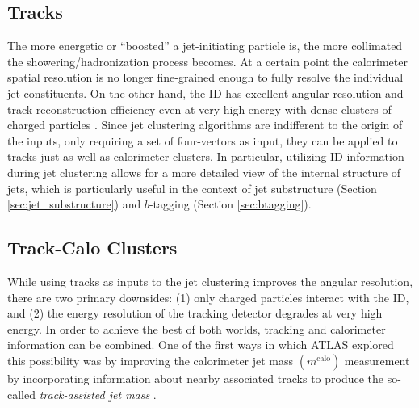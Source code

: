 \subsection{Tracks}
The more energetic or ``boosted'' a jet-initiating particle is, the more collimated the showering/hadronization process becomes.
At a certain point the calorimeter spatial resolution is no longer fine-grained enough to fully resolve the individual jet constituents.
On the other hand, the ID has excellent angular resolution and track reconstruction efficiency even at very high energy with dense clusters of charged particles \cite{Aaboud:2017all}.
Since jet clustering algorithms are indifferent to the origin of the inputs, only requiring a set of four-vectors as input, they can be applied to tracks just as well as calorimeter clusters.
In particular, utilizing ID information during jet clustering allows for a more detailed view of the internal structure of jets, which is particularly useful in the context of jet substructure (Section \ref{sec:jet_substructure}) and $b$-tagging (Section \ref{sec:btagging}).

\subsection{Track-Calo Clusters}
\label{sec:tcc_constituents}
\newcommand{\mCALO}{\ensuremath{m^{\mathrm{calo}}}}
\newcommand{\mTRACK}{\ensuremath{m^{\mathrm{track}}}}
\newcommand{\mTA}{\ensuremath{m^{\mathrm{TA}}}}
\newcommand{\ptCALO}{\ensuremath{p_T^{\mathrm{calo}}}}
\newcommand{\ptTRACK}{\ensuremath{p_T^{\mathrm{track}}}}
While using tracks as inputs to the jet clustering improves the angular resolution, there are two primary downsides: (1) only charged particles interact with the ID, and (2) the energy resolution of the tracking detector degrades at very high energy.
In order to achieve the best of both worlds, tracking and calorimeter information can be combined.
One of the first ways in which ATLAS explored this possibility was by improving the calorimeter jet mass $(\mCALO)$ measurement by incorporating information about nearby associated tracks to produce the so-called \textit{track-assisted jet mass} \cite{ATLAS-CONF-2016-035}.

